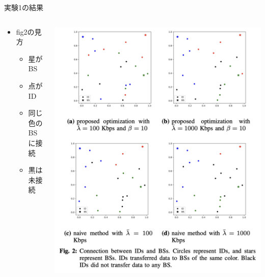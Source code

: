 \documentclass[unicode,12pt,aspectratio=169, dvipdfmx]{beamer}
\begin{document}
    \begin{frame}{実験1の結果}
        \begin{columns}
            \begin{column}[T]{.5\linewidth}
                \begin{itemize}
                \item fig2の見方
                    \begin{itemize}
                        \item 星がBS
                        \item 点がID
                        \item 同じ色のBSに接続
                        \item 黒は未接続
                    \end{itemize}
                \end{itemize}    
            \end{column}
            \begin{column}[T]{.5\linewidth}
                \begin{center}
                    \includegraphics[scale=0.3]{figures/fig-2.png}                    
                \end{center}
                \end{column}
        \end{columns}
    \end{frame}
\end{document}
